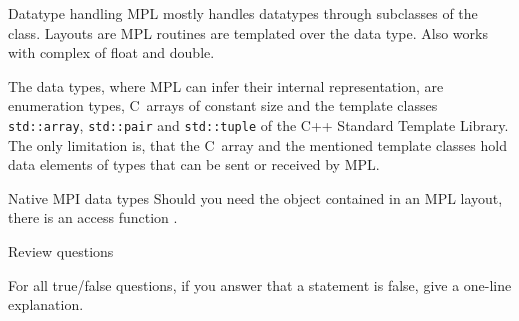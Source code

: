 \begin{mplnote}{Datatype handling}
  MPL mostly handles datatypes through subclasses
  of the  class.
  Layouts are 
  MPL routines are templated over the data type.
  Also works with complex of float and double.

  The data types,
  where MPL can infer their internal representation, are enumeration
  types, C~arrays of constant size and the template classes
  \lstinline+std::array+,
  \lstinline+std::pair+ and
  \lstinline+std::tuple+
  of the C++ Standard Template
  Library. The only limitation is, that the C~array and the mentioned
  template classes hold data elements of types that can be sent or
  received by MPL.
\end{mplnote}

\begin{mplnote}{Native MPI data types}
  Should you need the  object
  contained in an MPL layout,
  there is an access function .
\end{mplnote}










\newpage
{} {Review questions}

For all true/false questions, if you answer that a statement is false,
give a one-line explanation.

